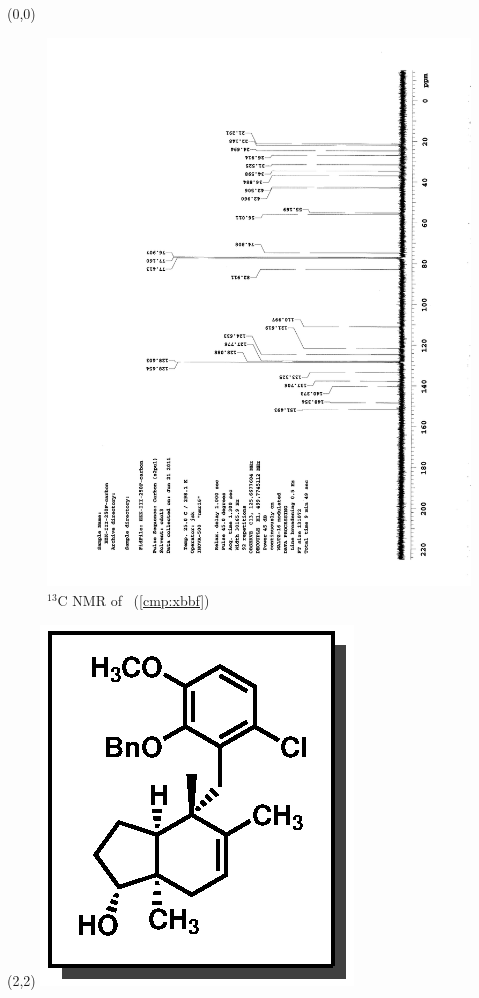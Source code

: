 \clearpage
\begin{textblock}{20}(0,0)
\begin{figure}[htb]
\caption{$^{13}$C NMR of  \CMPxbbf\ (\ref{cmp:xbbf})}
\includegraphics[scale=0.75, trim = 0mm 0mm 0mm 5mm,
clip]{chp_singlecarbon/images/nmr/xbbfC}
\vspace{-100pt}
\end{figure}
\end{textblock}
\begin{textblock}{1}(2,2)
\includegraphics[scale=0.8, angle=90]{chp_singlecarbon/images/xbbf}
\end{textblock}
\clearpage


